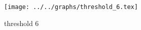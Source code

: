 \begin{figure}[h] \centering\texttt{[image: ../../graphs/threshold\_6.tex]}\caption{threshold 6}\label{gr:threshold_6} \end{figure}
